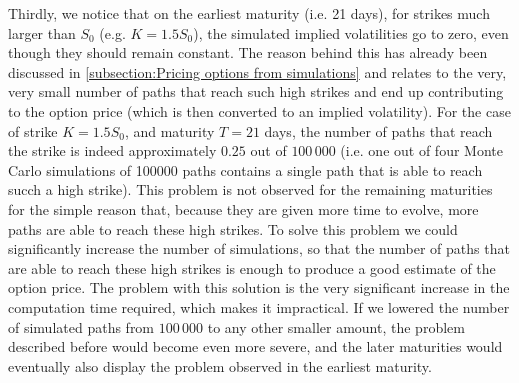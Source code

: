 Thirdly, we notice that on the earliest maturity (i.e. 21 days), for strikes much larger than $S_0$ (e.g. $K=1.5S_0$), the simulated implied volatilities go to zero, even though they should remain constant. The reason behind this has already been discussed in \autoref{subsection:Pricing options from simulations} and relates to the very, very small number of paths that reach such high strikes and end up contributing to the option price (which is then converted to an implied volatility). For the case of strike $K=1.5S_0$, and maturity $T=21$ days, the number of paths that reach the strike is indeed approximately $0.25$ out of $100\,000$ (i.e. one out of four Monte Carlo simulations of 100000 paths contains a single path that is able to reach succh a high strike). This problem is not observed for the remaining maturities for the simple reason that, because they are given more time to evolve, more paths are able to reach these high strikes.
To solve this problem we could significantly increase the number of simulations, so that the number of paths that are able to reach these high strikes is enough to produce a good estimate of the option price. The problem with this solution is the very significant increase in the computation time required, which makes it impractical.
If we lowered the number of simulated paths from $100\,000$ to any other smaller amount, the problem described before would become even more severe, and the later maturities would eventually also display the problem observed in the earliest maturity.

